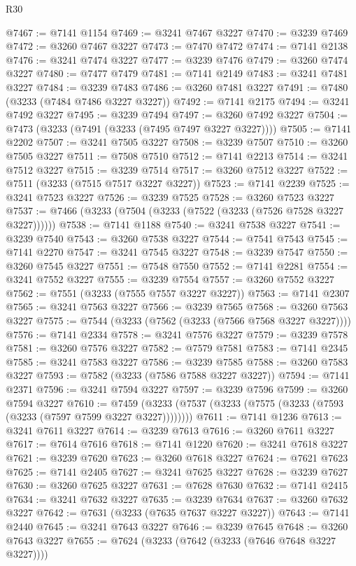\begin{lexlean}{R30}
\begin{coremodule}
@7467 := @7141 @1154
@7469 := @3241 @7467 @3227
@7470 := @3239 @7469
@7472 := @3260 @7467 @3227
@7473 := @7470 @7472
@7474 := @7141 @2138
@7476 := @3241 @7474 @3227
@7477 := @3239 @7476
@7479 := @3260 @7474 @3227
@7480 := @7477 @7479
@7481 := @7141 @2149
@7483 := @3241 @7481 @3227
@7484 := @3239 @7483
@7486 := @3260 @7481 @3227
@7491 := @7480 (@3233 (@7484 @7486 @3227 @3227))
@7492 := @7141 @2175
@7494 := @3241 @7492 @3227
@7495 := @3239 @7494
@7497 := @3260 @7492 @3227
@7504 := @7473 (@3233 (@7491 (@3233 (@7495 @7497 @3227 @3227))))
@7505 := @7141 @2202
@7507 := @3241 @7505 @3227
@7508 := @3239 @7507
@7510 := @3260 @7505 @3227
@7511 := @7508 @7510
@7512 := @7141 @2213
@7514 := @3241 @7512 @3227
@7515 := @3239 @7514
@7517 := @3260 @7512 @3227
@7522 := @7511 (@3233 (@7515 @7517 @3227 @3227))
@7523 := @7141 @2239
@7525 := @3241 @7523 @3227
@7526 := @3239 @7525
@7528 := @3260 @7523 @3227
@7537 := @7466 (@3233 (@7504 (@3233 (@7522 (@3233 (@7526 @7528 @3227 @3227))))))
@7538 := @7141 @1188
@7540 := @3241 @7538 @3227
@7541 := @3239 @7540
@7543 := @3260 @7538 @3227
@7544 := @7541 @7543
@7545 := @7141 @2270
@7547 := @3241 @7545 @3227
@7548 := @3239 @7547
@7550 := @3260 @7545 @3227
@7551 := @7548 @7550
@7552 := @7141 @2281
@7554 := @3241 @7552 @3227
@7555 := @3239 @7554
@7557 := @3260 @7552 @3227
@7562 := @7551 (@3233 (@7555 @7557 @3227 @3227))
@7563 := @7141 @2307
@7565 := @3241 @7563 @3227
@7566 := @3239 @7565
@7568 := @3260 @7563 @3227
@7575 := @7544 (@3233 (@7562 (@3233 (@7566 @7568 @3227 @3227))))
@7576 := @7141 @2334
@7578 := @3241 @7576 @3227
@7579 := @3239 @7578
@7581 := @3260 @7576 @3227
@7582 := @7579 @7581
@7583 := @7141 @2345
@7585 := @3241 @7583 @3227
@7586 := @3239 @7585
@7588 := @3260 @7583 @3227
@7593 := @7582 (@3233 (@7586 @7588 @3227 @3227))
@7594 := @7141 @2371
@7596 := @3241 @7594 @3227
@7597 := @3239 @7596
@7599 := @3260 @7594 @3227
@7610 := @7459 (@3233 (@7537 (@3233 (@7575 (@3233 (@7593 (@3233 (@7597 @7599 @3227 @3227))))))))
@7611 := @7141 @1236
@7613 := @3241 @7611 @3227
@7614 := @3239 @7613
@7616 := @3260 @7611 @3227
@7617 := @7614 @7616
@7618 := @7141 @1220
@7620 := @3241 @7618 @3227
@7621 := @3239 @7620
@7623 := @3260 @7618 @3227
@7624 := @7621 @7623
@7625 := @7141 @2405
@7627 := @3241 @7625 @3227
@7628 := @3239 @7627
@7630 := @3260 @7625 @3227
@7631 := @7628 @7630
@7632 := @7141 @2415
@7634 := @3241 @7632 @3227
@7635 := @3239 @7634
@7637 := @3260 @7632 @3227
@7642 := @7631 (@3233 (@7635 @7637 @3227 @3227))
@7643 := @7141 @2440
@7645 := @3241 @7643 @3227
@7646 := @3239 @7645
@7648 := @3260 @7643 @3227
@7655 := @7624 (@3233 (@7642 (@3233 (@7646 @7648 @3227 @3227))))

\end{coremodule}
\end{lexlean}
